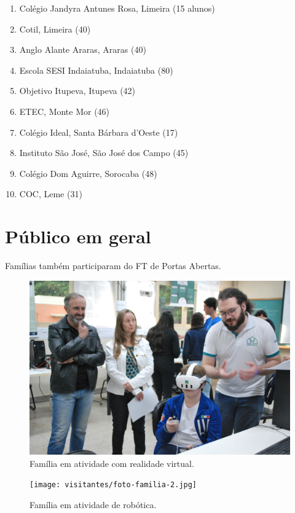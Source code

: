 \documentclass[
  letterpaper,
  DIV=11,
  numbers=noendperiod]{scrreprt}
\begin{document}
\begin{enumerate}
\def\labelenumi{\arabic{enumi}.}
\item
  Colégio Jandyra Antunes Rosa, Limeira (15 alunos)
\item
  Cotil, Limeira (40)
\item
  Anglo Alante Araras, Araras (40)
\item
  Escola SESI Indaiatuba, Indaiatuba (80)
\item
  Objetivo Itupeva, Itupeva (42)
\item
  ETEC, Monte Mor (46)
\item
  Colégio Ideal, Santa Bárbara d'Oeste (17)
\item
  Instituto São José, São José dos Campo (45)
\item
  Colégio Dom Aguirre, Sorocaba (48)
\item
  COC, Leme (31)
\end{enumerate}

\section{Público em geral}\label{puxfablico-em-geral}

Famílias também participaram do FT de Portas Abertas.

\begin{figure}[H]

{\centering \includegraphics[width=0.7\linewidth,height=\textheight,keepaspectratio]{visitantes/foto-familia.jpg}

}

\caption{Família em atividade com realidade virtual.}

\end{figure}%

\begin{figure}[H]

{\centering \texttt{[image: visitantes/foto-familia-2.jpg]}

}

\caption{Família em atividade de robótica.}

\end{figure}%
\end{document}
